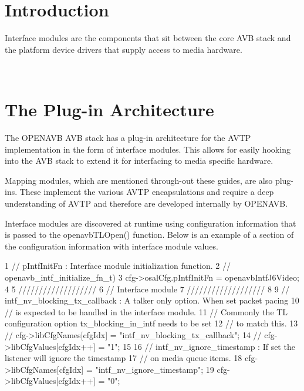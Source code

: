 \hypertarget{sdk_avtp_interface_module_dev_sdk_avtp_intf_module_introduction}{}\section{Introduction }\label{sdk_avtp_interface_module_dev_sdk_avtp_intf_module_introduction}
Interface modules are the components that sit between the core A\+VB stack and the platform device drivers that supply access to media hardware.

~\newline
\hypertarget{sdk_avtp_interface_module_dev_sdk_avtp_intf_module_plugin}{}\section{The Plug-\/in Architecture }\label{sdk_avtp_interface_module_dev_sdk_avtp_intf_module_plugin}
The O\+P\+E\+N\+A\+VB A\+VB stack has a plug-\/in architecture for the A\+V\+TP implementation in the form of interface modules. This allows for easily hooking into the A\+VB stack to extend it for interfacing to media specific hardware.

Mapping modules, which are mentioned through-\/out these guides, are also plug-\/ins. These implement the various A\+V\+TP encapsulations and require a deep understanding of A\+V\+TP and therefore are developed internally by O\+P\+E\+N\+A\+VB.

Interface modules are discovered at runtime using configuration information that is passed to the openavb\+T\+L\+Open() function. Below is an example of a section of the configuration information with interface module values.


\begin{DoxyCode}
1 // pIntfInitFn : Interface module initialization function.
2 // openavb\_intf\_initialize\_fn\_t)
3 cfg->osalCfg.pIntfInitFn = openavbIntfJ6Video;
4 
5 ///////////////////
6 // Interface module
7 ///////////////////
8 
9 // intf\_nv\_blocking\_tx\_callback : A talker only option. When set packet pacing
10 // is expected to be handled in the interface module.
11 // Commonly the TL configuration option tx\_blocking\_in\_intf needs to be set
12 // to match this.
13 // cfg->libCfgNames[cfgIdx] = "intf\_nv\_blocking\_tx\_callback";
14 // cfg->libCfgValues[cfgIdx++] = "1";
15 
16 // intf\_nv\_ignore\_timestamp : If set the listener will ignore the timestamp
17 // on media queue items.
18 cfg->libCfgNames[cfgIdx] = "intf\_nv\_ignore\_timestamp";
19 cfg->libCfgValues[cfgIdx++] = "0";
\end{DoxyCode}



